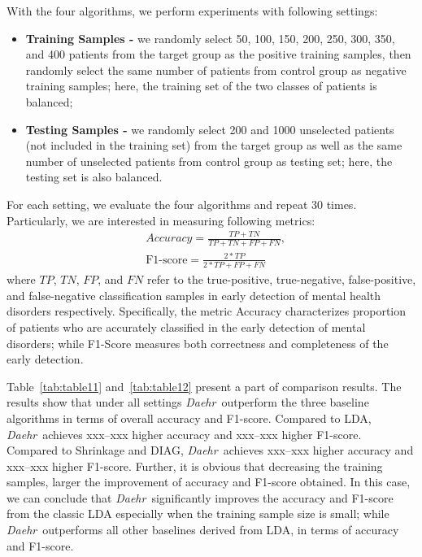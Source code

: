 \documentclass[journal,compsoc]{IEEEtran}
\newcommand{\TheName}{\mbox{\emph{Daehr}}}
\begin{document}
With the four algorithms, we perform experiments with following settings:
\begin{itemize}
\item \textbf{Training Samples - } we randomly select 50, 100, 150, 200, 250, 300, 350, and 400 patients from the target group as the positive training samples, then randomly select the same number of patients from control group as negative training samples; here, the training set of the two classes of patients is balanced;
\item \textbf{Testing Samples - } we randomly select 200 and 1000 unselected patients (not included in the training set) from the target group as well as the same number of unselected patients from control group as testing set; here, the testing set is also balanced.
\end{itemize}
%
For each setting, we evaluate the four algorithms and repeat 30 times. Particularly, we are interested in measuring following metrics: 
\begin{equation}
\begin{aligned}
&Accuracy=\frac{TP+TN}{TP+TN+FP+FN},\\
&\text{F1-score}=\frac{2*TP}{2*TP+FP+FN}
\end{aligned}
\end{equation}
where $TP$, $TN$, $FP$, and $FN$ refer to the true-positive, true-negative, false-positive, and false-negative classification samples in early detection of mental health disorders respectively. Specifically, the metric Accuracy characterizes proportion of patients who are accurately classified in the early detection of mental disorders; while F1-Score measures both correctness and completeness of the early detection. 

Table~\ref{tab:table11} and~\ref{tab:table12} present a part of comparison results. The results show that under all settings \TheName\ outperform the three baseline algorithms in terms of overall accuracy and F1-score. Compared to LDA, \TheName\ achieves xxx--xxx higher accuracy and xxx--xxx higher F1-score. Compared to Shrinkage and DIAG, \TheName\ achieves xxx--xxx higher accuracy and xxx--xxx higher F1-score. Further, it is obvious that decreasing the training samples, larger the improvement of accuracy and F1-score obtained. In this case, we can conclude that \TheName\ significantly improves the accuracy and F1-score from the classic LDA especially when the training sample size is small; while \TheName\ outperforms all other baselines derived from LDA, in terms of accuracy and F1-score. 
\end{document}
